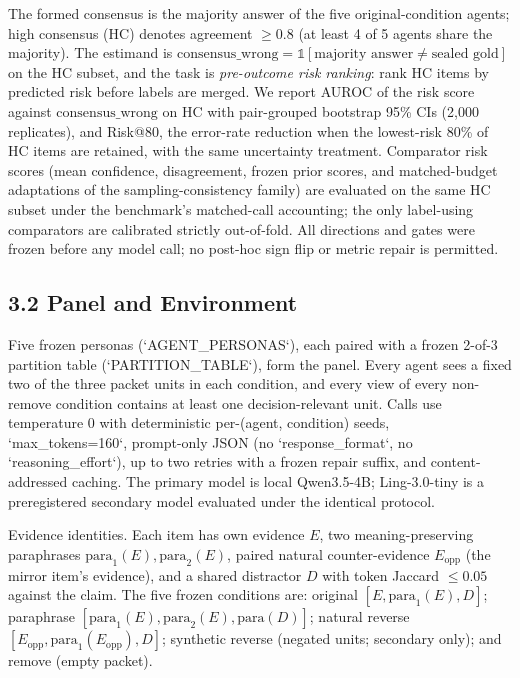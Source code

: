 \documentclass[11pt]{article}
\begin{document}
The formed consensus is the majority answer of the five original-condition agents; high consensus (HC) denotes agreement $\geq 0.8$ (at least 4 of 5 agents share the majority). The estimand is $\mathrm{consensus\_wrong} = \mathbb{1}[\text{majority answer} \neq \text{sealed gold}]$ on the HC subset, and the task is \emph{pre-outcome risk ranking}: rank HC items by predicted risk before labels are merged. We report AUROC of the risk score against $\mathrm{consensus\_wrong}$ on HC with pair-grouped bootstrap 95\% CIs (2,000 replicates), and Risk@80, the error-rate reduction when the lowest-risk 80\% of HC items are retained, with the same uncertainty treatment. Comparator risk scores (mean confidence, disagreement, frozen prior scores, and matched-budget adaptations of the sampling-consistency family) are evaluated on the same HC subset under the benchmark's matched-call accounting; the only label-using comparators are calibrated strictly out-of-fold. All directions and gates were frozen before any model call; no post-hoc sign flip or metric repair is permitted.

\subsection{3.2 Panel and Environment}

Five frozen personas (`AGENT\_PERSONAS`), each paired with a frozen 2-of-3 partition table (`PARTITION\_TABLE`), form the panel. Every agent sees a fixed two of the three packet units in each condition, and every view of every non-remove condition contains at least one decision-relevant unit. Calls use temperature 0 with deterministic per-(agent, condition) seeds, `max\_tokens=160`, prompt-only JSON (no `response\_format`, no `reasoning\_effort`), up to two retries with a frozen repair suffix, and content-addressed caching. The primary model is local Qwen3.5-4B; Ling-3.0-tiny is a preregistered secondary model evaluated under the identical protocol.

Evidence identities. Each item has own evidence $E$, two meaning-preserving paraphrases $\mathrm{para}_1(E), \mathrm{para}_2(E)$, paired natural counter-evidence $E_{\mathrm{opp}}$ (the mirror item's evidence), and a shared distractor $D$ with token Jaccard $\leq 0.05$ against the claim. The five frozen conditions are: original $[E, \mathrm{para}_1(E), D]$; paraphrase $[\mathrm{para}_1(E), \mathrm{para}_2(E), \mathrm{para}(D)]$; natural reverse $[E_{\mathrm{opp}}, \mathrm{para}_1(E_{\mathrm{opp}}), D]$; synthetic reverse (negated units; secondary only); and remove (empty packet).
\end{document}
